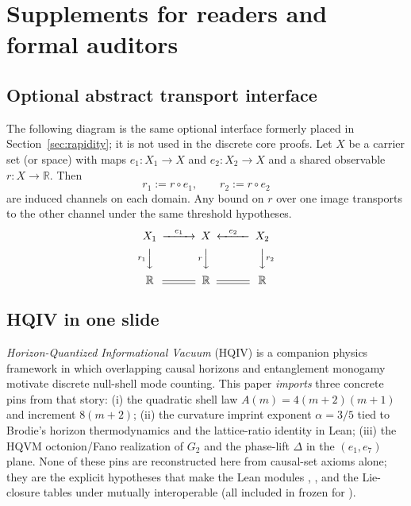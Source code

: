 \documentclass[11pt]{amsart}
\newcommand{\PaperArtifactBundleZip}{\ReleaseDistArchive}
\begin{document}
\section{Supplements for readers and formal auditors}

\subsection{Optional abstract transport interface}
\label{app:transport}
The following diagram is the same optional interface formerly placed in Section~\ref{sec:rapidity}; it is not used in the discrete core proofs. Let $X$ be a carrier set (or space) with maps $e_1:X_1\to X$ and $e_2:X_2\to X$ and a shared observable $r:X\to\mathbb R$. Then
\[
r_1:=r\circ e_1,\qquad r_2:=r\circ e_2
\]
are induced channels on each domain. Any bound on $r$ over one image transports to the other channel under the same threshold hypotheses.
\[
\begin{CD}
X_1 @>{e_1}>> X @<{e_2}<< X_2\\
@V{r_1}VV @V{r}VV @VV{r_2}V\\
\mathbb R @= \mathbb R @= \mathbb R
\end{CD}
\]

\subsection{HQIV in one slide}
\label{app:hqiv-box}
\emph{Horizon-Quantized Informational Vacuum} (HQIV) is a companion physics framework in which overlapping causal horizons and entanglement monogamy motivate discrete null-shell mode counting. This paper \emph{imports} three concrete pins from that story: (i) the quadratic shell law \(A(m)=4(m+2)(m+1)\) and increment \(8(m+2)\); (ii) the curvature imprint exponent \(\alpha=3/5\) tied to Brodie's horizon thermodynamics \cite{brodie2026} and the lattice-ratio identity in Lean; (iii) the HQVM octonion/Fano realization of \(G_2\) and the phase-lift \(\Delta\) in the \((e_1,e_7)\) plane. None of these pins are reconstructed here from causal-set axioms alone; they are the explicit hypotheses that make the Lean modules , , and the Lie-closure tables under  mutually interoperable (all included in \PaperArtifactBundleZip{} frozen for ).
\end{document}

